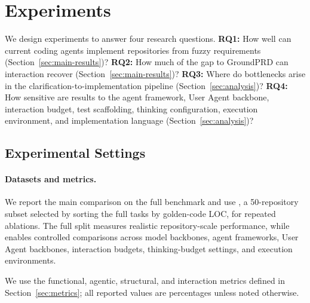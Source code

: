 \section{Experiments}
\label{sec:experiments}

We design experiments to answer four research questions. \textbf{RQ1:} How well can current coding agents implement repositories from fuzzy requirements (Section~\ref{sec:main-results})? \textbf{RQ2:} How much of the gap to GroundPRD can interaction recover (Section~\ref{sec:main-results})? \textbf{RQ3:} Where do bottlenecks arise in the clarification-to-implementation pipeline (Section~\ref{sec:analysis})? \textbf{RQ4:} How sensitive are results to the agent framework, User Agent backbone, interaction budget, test scaffolding, thinking configuration, execution environment, and implementation language (Section~\ref{sec:analysis})?

\subsection{Experimental Settings}
\label{sec:experimental-settings}

\paragraph{Datasets and metrics.}
We report the main comparison on the full \rcb{} benchmark and use \rcblite{}, a 50-repository subset selected by sorting the full tasks by golden-code LOC, for repeated ablations. The full split measures realistic repository-scale performance, while \rcblite{} enables controlled comparisons across model backbones, agent frameworks, User Agent backbones, interaction budgets, thinking-budget settings, and execution environments.

We use the functional, agentic, structural, and interaction metrics defined in Section~\ref{sec:metrics}; all reported values are percentages unless noted otherwise.

